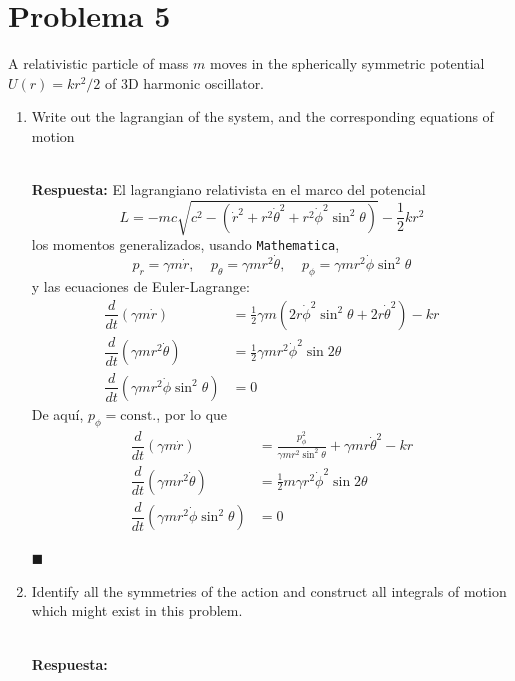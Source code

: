 \documentclass[]{article}
\numberwithin{equation}{section}
\newcommand{\0}{\textcolor{gray}{0}}
\newcommand{\td}[2]{\dfrac{d #1}{d #2}}
\newcommand{\qed}{\hfill\(\blacksquare\)}
\newcommand{\resp}{
	\\
	
	\textbf{Respuesta:} }
\begin{document}
\section{Problema 5}
A relativistic particle of mass $m$ moves in the spherically symmetric potential $U (r) = kr^2/2$ of 3D harmonic oscillator.
\begin{enumerate}
	\item[(a)] Write out the lagrangian of the system, and the corresponding equations of motion
	\resp El lagrangiano relativista en el marco del potencial
	\begin{equation}
		L = -m c \sqrt{c^2 - \left(\dot{r}^2 + r^2 \dot{\theta}^2 + r^2\dot{\phi}^2 \sin^2 \theta \right)} - \frac{1}{2} k r^2
	\end{equation}
	los momentos generalizados, usando \texttt{Mathematica},
	\begin{equation}
		p_r = \gamma m \dot{r}, ~~~~~ p_\theta = \gamma m r^2 \dot{\theta}, ~~~~~ p_\phi = \gamma m r^2 \dot{\phi} \sin^2\theta
	\end{equation}
	y las ecuaciones de Euler-Lagrange:
	\begin{align*}
		\td{}{t} \left( \gamma m \dot{r} \right) &= \frac{1}{2} \gamma m \left(2 r \dot{\phi}^2 \sin ^2 \theta + 2 r \dot{\theta}^2\right) - k r\\
		\td{}{t} \left( \gamma m r^2 \dot{\theta} \right) &= \frac{1}{2} \gamma m r^2 \dot{\phi}^2 \sin 2\theta\\
		\td{}{t} \left( \gamma m r^2 \dot{\phi} \sin^2\theta \right) &= 0
	\end{align*}
	De aquí, $p_\phi = \mathrm{const.}$, por lo que
	\begin{align*}
		\td{}{t} \left( \gamma m \dot{r} \right) &= \frac{p_\phi^2}{\gamma m r^2 \sin^2\theta} + \gamma m r \dot{\theta}^2 - k r\\
		\td{}{t} \left( \gamma m r^2 \dot{\theta} \right) &= \frac{1}{2} m \gamma r^2 \dot{\phi}^2 \sin 2\theta\\
		\td{}{t} \left( \gamma m r^2 \dot{\phi} \sin^2\theta \right) &= 0
	\end{align*}
	
	\qed
	
	\item[(b)] Identify all the symmetries of the action and construct all integrals of motion which might exist in this problem.
	\resp
	

\end{enumerate}
\end{document}
